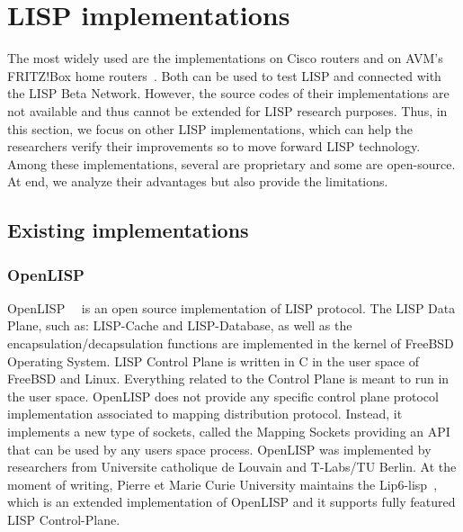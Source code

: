 \section{LISP implementations}
\label{sec:implementation}
The most widely used are the implementations on Cisco routers and on AVM's FRITZ!Box home routers~\cite{AVMFritzBox}. Both can be used to test LISP and connected with the LISP Beta Network. However, the source codes of their implementations are not available and thus cannot be extended for LISP research purposes. Thus, in this section, we focus on other LISP implementations, which can help the researchers verify their improvements so to move forward LISP technology. Among these implementations, several are proprietary and some are open-source. At end, we analyze their advantages but also provide the limitations.

\subsection{Existing implementations}
\label{subsec:implementation_existing}

\subsubsection{OpenLISP}
\label{subsubsec:implementation_OpenLISP}
OpenLISP~\cite{OpenLISP}~\cite{phung2014openlisp} is an open source implementation of LISP protocol. The LISP Data Plane, such as: LISP-Cache and LISP-Database, as well as the encapsulation/decapsulation functions are implemented in the kernel of FreeBSD~\cite{freeBSD} Operating System. LISP Control Plane is written in C in the user space of FreeBSD and Linux. Everything related to the Control Plane is meant to run in the user space. OpenLISP does not provide any specific control plane protocol implementation associated to mapping distribution protocol. Instead, it implements a new type of sockets, called the Mapping Sockets providing an API that can be used by any users space process. OpenLISP was implemented by researchers from Universite catholique de Louvain and T-Labs/TU Berlin. At the moment of writing, Pierre et Marie Curie University maintains the Lip6-lisp~\cite{lip6lisp}, which is an extended implementation of OpenLISP and it supports fully featured LISP Control-Plane.


